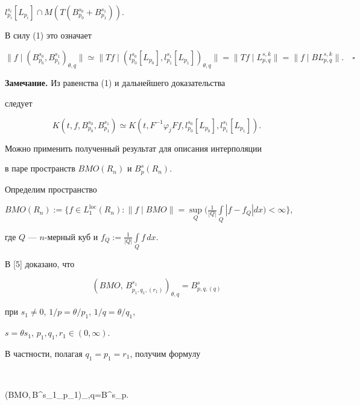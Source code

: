 $l^{s_i}_{p_i}[L_{p_i}]\cap M(T 


(B^{s_0}_{p_0}+B^{s_1}_{p_1}))$. 


В силу (1) это означает 


$$ 


\|f\mid(B^{s_0}_{p_0},B^{s_1}_{p_1})_{\theta,q}\|\simeq 


\|T f\mid(l^{s_0}_{p_0}[L_{p_0}],l^{s_1}_{p_1}[L_{p_1}])_{\theta,q}\| 


=\|T f\mid L^{s,k}_{p,q}\|=\|f\mid BL^{s,k}_{p,q}\|.\quad\square 


$$ 


 


{\bf Замечание.} Из равенства (1) и дальнейшего доказательства 


следует


$$ 


K(t,f,B^{s_0}_{p_0},B^{s_1}_{p_1})\simeq K(t,F^{-1} 


\varphi_j Ff,l^{s_0}_{p_0}[L_{p_0}],l^{s_1}_{p_1}[L_{p_1}]). 


$$ 


 


Можно применить полученный результат для описания интерполяции 


в паре пространств $BMO(R_n)$ и $B^s_p(R_n)$. 


Определим пространство 


$BMO(R_n):=\Big\{f\in L^{\text{loc}}_1(R_n):\|f\mid BMO\|= 


\sup\limits_Q\Big(\frac{1}{|Q|}\int\limits_Q|f-f_Q|dx\Big)<\infty 


\Big\}$, 


где $Q$ --- $n$-мерный куб и $f_Q:=\frac{1}{|Q|}\int\limits_Q f\,dx$. 


 


В [5] доказано, что 


$$ 


(BMO,\,B^{s_1}_{p_1,q_1,(r_1)})_{\theta,q}= 


B^s_{p,q,(q)} 


$$ 


при $s_1\ne 0$, $1/p=\theta/p_1$, $1/q=\theta/q_1$, 


$s=\theta s_1$, $p_1,q_1,r_1\in(0,\infty)$. 


В частности, полагая $q_1=p_1=r_1$, получим формулу 


$$ 


(BMO,\,B^{s_1}_{p_1})_{\theta,q}=B^s_p. 


